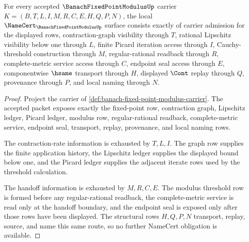 \begin{theorem}
\label{thm:banach-fixed-point-modulus-namecert-obligations}
For every accepted $\BanachFixedPointModulusUp$ carrier $K=(B,T,L,I,M,R,C,E,H,Q,P,N)$, the local $\NameCert_{\BanachFixedPointModulusUp}$ surface consists exactly of carrier admission for the displayed rows, contraction-graph visibility through $T$, rational Lipschitz visibility below one through $L$, finite Picard iteration access through $I$, Cauchy-threshold construction through $M$, regular-rational readback through $R$, complete-metric service access through $C$, endpoint seal access through $E$, componentwise $\hsame$ transport through $H$, displayed $\Cont$ replay through $Q$, provenance through $P$, and local naming through $N$.
\end{theorem}
\begin{proof}
Project the carrier of \autoref{def:banach-fixed-point-modulus-carrier}. The accepted packet exposes exactly the fixed-point row, contraction graph, Lipschitz ledger, Picard ledger, modulus row, regular-rational readback, complete-metric service, endpoint seal, transport, replay, provenance, and local naming rows.

The contraction-rate information is exhausted by $T,L,I$. The graph row supplies the finite application history, the Lipschitz ledger supplies the displayed bound below one, and the Picard ledger supplies the adjacent iterate rows used by the threshold calculation.

The handoff information is exhausted by $M,R,C,E$. The modulus threshold row is formed before any regular-rational readback, the complete-metric service is read only at the handoff boundary, and the endpoint seal is exposed only after those rows have been displayed. The structural rows $H,Q,P,N$ transport, replay, source, and name this same route, so no further NameCert obligation is available.
\end{proof}

